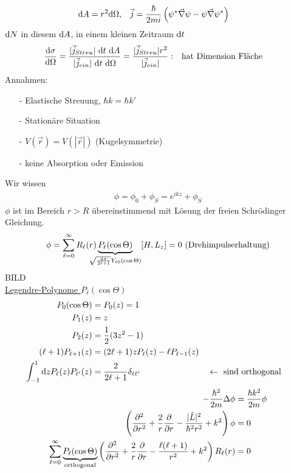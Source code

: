 		\begin{align*}
			\mathrm{d} A &= r^2 \mathrm{d} \Omega ,& 
			\vec{j} &= \frac{\hbar}{2 m i} \left(\psi^* \vec{\nabla} \psi - \psi \vec{\nabla} \psi^* \right)
		\end{align*}
	$\mathrm{d} N$ in diesem $\mathrm{d} A$, in einem kleinen Zeitraum $\mathrm{d} t$ 
		\begin{align*}
			\frac{\mathrm{d} \sigma}{\mathrm{d} \Omega}
			&= \frac{|\vec{j}_{Streu}| ~\mathrm{d} t ~ \mathrm{d} A}{ |\vec{j}_{ein}| ~\mathrm{d} t ~ \mathrm{d} \Omega}
			=\frac{|\vec{j}_{Streu}| r^2}{|\vec{j}_{ein}|} :&
			&\text{hat Dimension Fläche}
		\end{align*}
	Annahmen:
		\begin{itemize}
			\item[-] 	Elastische Streuung, $\hbar k = \hbar k'$
			\item[-]	Stationäre Situation
			\item[-]	$V(\vec{r}) = V(|\vec{r}|)$ (Kugelsymmetrie)
			\item[-]	keine Absorption oder Emission
		\end{itemize}
	Wir wissen
		\begin{align*}
			\phi = \phi_0 + \phi_S = e^{i k z} + \phi_S
		\end{align*}
	$\phi$ ist im Bereich $r>R$ übereinstimmend mit Lösung der freien Schrödinger Gleichung.
		\begin{align*}
			\phi = \sum_{\ell = 0}^{\infty} R_\ell (r) 
			\underbrace{P_\ell (\cos \Theta)}_{\mathclap{\sqrt{\frac{4 \pi}{2\ell+1}} 
					Y_{\ell 0}(\cos \Theta)}} 
			& &[H, L_z] = 0 ~(\text{Drehimpulserhaltung})
		\end{align*}
	BILD \\
	\underline{Legendre-Polynome $P_\ell (\cos \Theta)$}
		\begin{align*}
			P_0 (\cos \Theta) &= P_0 (z) = 1\\
			P_1 (z) &= z \\
			P_2 (z) &= \frac{1}{2} (3z^2-1) \\
			(\ell + 1) P_{\ell + 1} (z) &= (2 \ell + 1) z P_\ell (z) - \ell P_{\ell - 1} (z) \\
			\int_{-1}^{1} \mathrm{d} z P_\ell (z) P_{\ell'} (z) &= 
			\frac{2}{2\ell + 1} \delta_{\ell \ell'} &
			&\leftarrow \text{ sind orthogonal}
		\end{align*}
		\begin{align*}
			-\frac{\hbar^2}{2m} \Delta \phi &= \frac{\hbar k^2}{2m} \phi \\
			\left( \frac{\partial^2}{\partial r^2} + \frac{2}{r} \frac{\partial}{\partial r} 
			- \frac{|\hat{L}|^2}{\hbar^2 r^2} + k^2
			\right) \phi &= 0 \\
			\sum_{\ell = 0}^{\infty} \underbrace{P_\ell (\cos \Theta)}_{\mathclap{\text{orthogonal}}}
			\left( \frac{\partial^2}{\partial r^2} + \frac{2}{r} \frac{\partial}{\partial r} 
			- \frac{\ell(\ell+1)}{r^2} + k^2
			\right) R_\ell (r) &= 0
		\end{align*}
